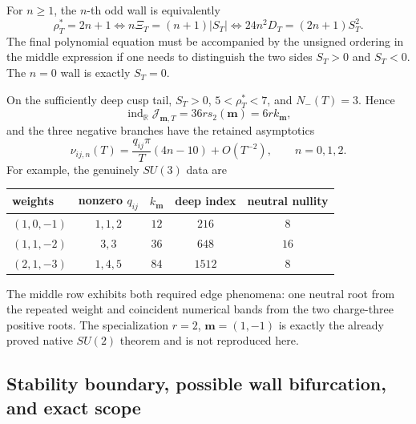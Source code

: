 For \(n\ge1\), the \(n\)-th odd wall is equivalently
\begin{equation}
 \rho_T^*=2n+1
 \iff n\Xi_T=(n+1)|S_T|
 \iff 24n^2D_T=(2n+1)S_T^2.
 \label{cusp-native-full-flux-suN-wall-equations}
\end{equation}
The final polynomial equation must be accompanied by the unsigned ordering
in the middle expression if one needs to distinguish the two sides
\(S_T>0\) and \(S_T<0\).  The \(n=0\) wall is exactly \(S_T=0\).

On the sufficiently deep cusp tail,
\(S_T>0\), \(5<\rho_T^*<7\), and \(N_-(T)=3\).  Hence
\begin{equation}
 \operatorname{ind}_{\mathbb R}\mathcal J_{\mathbf m,T}
 =36r s_2(\mathbf m)=6r k_{\mathbf m},
 \label{cusp-native-full-flux-suN-deep-index}
\end{equation}
and the three negative branches have the retained asymptotics
\begin{equation}
 \nu_{ij,n}(T)
 =\frac{q_{ij}\pi}{T}(4n-10)+O(T^{-2}),
 \qquad n=0,1,2.
 \label{cusp-native-full-flux-suN-negative-asymptotics}
\end{equation}
For example, the genuinely \(SU(3)\) data are
\begin{center}
\renewcommand{\arraystretch}{1.2}
\begin{tabular}{@{}lcccc@{}}
\toprule
weights & nonzero \(q_{ij}\) & \(k_{\mathbf m}\) & deep index
& neutral nullity\\
\midrule
\((1,0,-1)\) & \(1,1,2\) & \(12\) & \(216\) & \(8\)\\
\((1,1,-2)\) & \(3,3\) & \(36\) & \(648\) & \(16\)\\
\((2,1,-3)\) & \(1,4,5\) & \(84\) & \(1512\) & \(8\)\\
\bottomrule
\end{tabular}
\end{center}
The middle row exhibits both required edge phenomena: one neutral root from
the repeated weight and coincident numerical bands from the two charge-three
positive roots.  The specialization \(r=2\), \(\mathbf m=(1,-1)\) is
exactly the already proved native \(SU(2)\) theorem and is not reproduced
here.

\subsection{Stability boundary, possible wall bifurcation, and exact scope}

